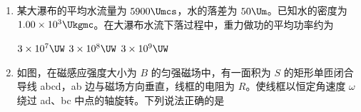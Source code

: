 \documentclass[\gkver]{gaokaozhenti}
\begin{document}
\begin{enumerate}
{	分析易得只有子弹射入沙箱并停留在沙箱中这个过程中系统的机械能才会损失，由动量守恒得，$mv = (m + M)v_{\text{共}}$，则系统损失的机械能

	$\Delta E = \frac{1}{2}mv^{2} - \frac{1}{2}(m + M)v_{\text{共}}^{2} = \frac{1}{2}mv^{2} - \frac{1}{2}(m + M)\left(\frac{mv}{m + M}\right)^{2} = \frac{mMv^{2}}{2(m + M)}$

	对于 A 选项，由 $\Delta E = \frac{mMv^{2}}{2(m + M)} = \frac{mv^{2}}{2\left(\frac{m}{M} + 1\right)}$ 可知若保持 $m$、$v$、$l$ 不变，$M$ 越大则系统损失的机械能越大，故 A 错误；

	对于 B 选项，由 $\Delta E = \frac{mMv^{2}}{2(m + M)} = \frac{Mv^{2}}{2\left(\frac{M}{m} + 1\right)}$ 可知若保持 $M$、$v$、$l$ 不变，$m$ 变大则系统损失的机械能变大，故 B 错误；

	对于 C 选项，由 $\Delta E = \frac{mMv^{2}}{2(m + M)}$ 可知若保持 $M$、$m$、$l$ 不变，$v$ 变大则系统损失的机械能变大，故 C 正确；

	对于 D 选项，子弹与沙箱共同向上摆动一小角度的过程系统机械能守恒，故 D 错误。

	（本题原卷及材料解析均为 C，而平台 JSON 答案标 B，二者不一致；答案命令按平台数据取 B，解析照原卷如实保留。）
}

\item
某大瀑布的平均水流量为 $5900\Umcs$，水的落差为 $50\Um$。已知水的密度为 $1.00\times10^{3}\Ukgmc$。在大瀑布水流下落过程中，重力做功的平均功率约为

{$3\times10^{7}\UW$}
{$3\times10^{8}\UW$}
{$3\times10^{9}\UW$}


\item
如图，在磁感应强度大小为 $B$ 的匀强磁场中，有一面积为 $S$ 的矩形单匝闭合导线 abcd，ab 边与磁场方向垂直，线框的电阻为 $R$。使线框以恒定角速度 $\omega$ 绕过 ad、bc 中点的轴旋转。下列说法正确的是


\end{enumerate}
\end{document}
